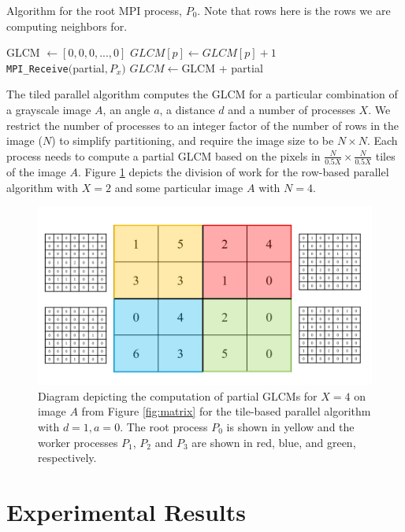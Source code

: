 \documentclass{article}
\begin{document}
\begin{algorithm}
    \caption{Algorithm for the root MPI process, $P_0$. Note that rows here is the rows we are computing neighbors for.}\label{alg:2}
    \begin{algorithmic}
        \State GLCM $\gets [0, 0, 0, ..., 0]$
            \State $GLCM[p] \gets GLCM[p] + 1$
        \EndIf
        \EndWhile \\
            \State \texttt{MPI\_Receive}$($partial$, P_x)$
            \State $GLCM \gets $GLCM + partial
        \EndFor
    \end{algorithmic}
\end{algorithm}
    The tiled parallel algorithm computes the GLCM for a particular combination of a grayscale image $A$, an angle $a$, a distance $d$ and a number of processes $X$. We restrict the number of processes to an integer factor of the number of rows in the image ($N$) to simplify partitioning, and require the image size to be $N \times N$. Each process needs to compute a partial GLCM based on the pixels in $\frac{N}{0.5X} \times \frac{N}{0.5X}$ tiles of the image $A$. Figure \ref{fig:tiles} depicts the division of work for the row-based parallel algorithm with $X = 2$ and some particular image $A$ with $N = 4$.
\begin{figure}[b]
      \includegraphics[width=\linewidth]{tile_partitioning.jpg}
      \caption{Diagram depicting the computation of partial GLCMs for $X = 4$ on image $A$ from Figure \ref{fig:matrix} for the tile-based parallel algorithm with $d = 1, a = 0$. The root process $P_0$ is shown in yellow and the worker processes $P_1$, $P_2$ and $P_3$ are shown in red, blue, and green, respectively. }
      \label{fig:tiles}
    \end{figure}
\section{Experimental Results}
\end{document}

